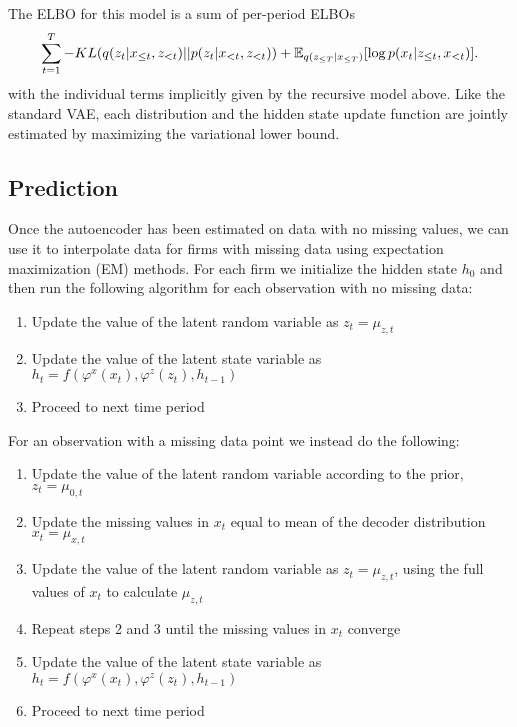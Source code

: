 \documentclass[12pt]{article}
\begin{document}
The ELBO for this model is a sum of per-period ELBOs
\begin{equation}
   \sum_{t=1}^{T} -KL(q(z_t|x_{\leq t}, z_{< t} ) || p(z_t | x_{< t}, z_{< t})) + \operatorname{\mathbb{E}}_{q(z_{\leq T}|x_{\leq T})}[\log p(x_t| z_{\leq t}, x_{< t})].
\end{equation}
with the individual terms implicitly given by the recursive model above. Like the standard VAE, each distribution and the 
hidden state update function are jointly estimated by maximizing the variational lower bound. 

\subsection{Prediction}

Once the autoencoder has been estimated on data with no missing values, we can use it to interpolate data for firms with missing 
data using expectation maximization (EM) methods. For each firm we initialize the hidden state $h_{0}$ and then run the following 
algorithm for each observation with no missing data:

\begin{enumerate}
   \item Update the value of the latent random variable as $z_t = \mu_{z,t}$
   \item Update the value of the latent state variable as  $h_t = f(\varphi^{x}(x_t), \varphi^{z}(z_t), h_{t-1})$
   \item Proceed to next time period
\end{enumerate}
For an observation with a missing data point we instead do the following:
\begin{enumerate}
   \item Update the value of the latent random variable according to the prior, $z_t = \mu_{0,t}$
   \item Update the missing values in $x_t$ equal to mean of the decoder distribution $x_t = \mu_{x,t}$
   \item Update the value of the latent random variable as $z_t = \mu_{z,t}$, using the full values of $x_t$ to calculate $\mu_{z,t}$
   \item Repeat steps 2 and 3 until the missing values in $x_t$ converge
   \item Update the value of the latent state variable as  $h_t = f(\varphi^{x}(x_t), \varphi^{z}(z_t), h_{t-1})$
   \item Proceed to next time period
\end{enumerate}
\end{document}

